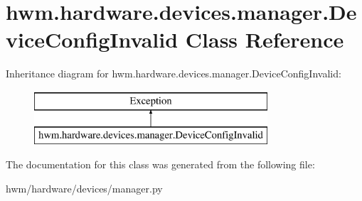 \hypertarget{classhwm_1_1hardware_1_1devices_1_1manager_1_1_device_config_invalid}{\section{hwm.\-hardware.\-devices.\-manager.\-Device\-Config\-Invalid Class Reference}
\label{classhwm_1_1hardware_1_1devices_1_1manager_1_1_device_config_invalid}
}
Inheritance diagram for hwm.\-hardware.\-devices.\-manager.\-Device\-Config\-Invalid\-:\begin{figure}[H]
\begin{center}
\leavevmode
\includegraphics[height=2.000000cm]{classhwm_1_1hardware_1_1devices_1_1manager_1_1_device_config_invalid}
\end{center}
\end{figure}


The documentation for this class was generated from the following file\-:\begin{DoxyCompactItemize}
\item 
hwm/hardware/devices/manager.\-py\end{DoxyCompactItemize}
